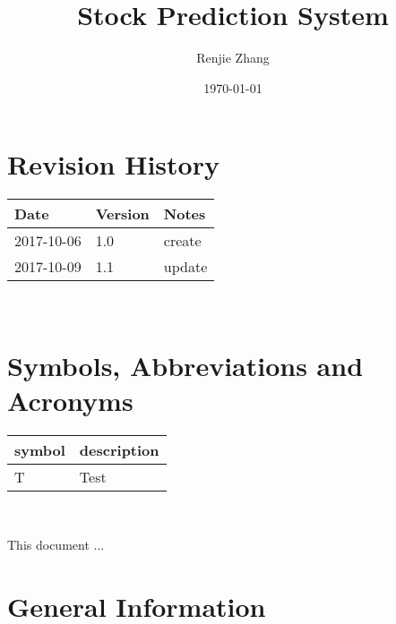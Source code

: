 \documentclass[12pt, titlepage]{article}
\begin{document}
\title{Stock Prediction System} 
\author{Renjie Zhang}
\date{\today}
	
\maketitle


\section{Revision History}

\begin{tabularx}{\textwidth}{p{3cm}p{2cm}X}
\toprule {\bf Date} & {\bf Version} & {\bf Notes}\\
\midrule
2017-10-06  & 1.0 & create\\
2017-10-09  & 1.1 & update\\
\bottomrule
\end{tabularx}

~\newpage

\section{Symbols, Abbreviations and Acronyms}

\renewcommand{\arraystretch}{1.2}
\begin{tabular}{l l} 
  \toprule		
  \textbf{symbol} & \textbf{description}\\
  \midrule 
  T & Test\\
  \bottomrule
\end{tabular}\\


\newpage

\tableofcontents

\listoftables

\listoffigures

\newpage


This document ...

\section{General Information}
\end{document}
